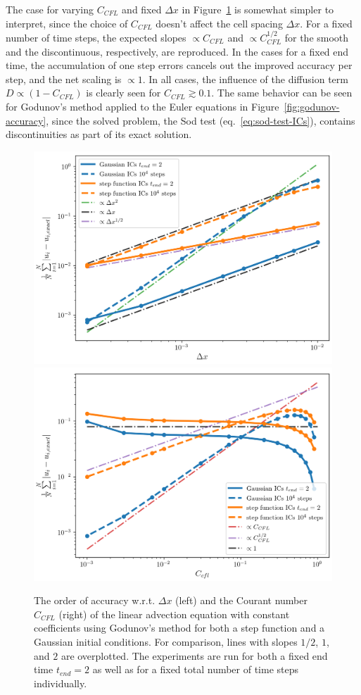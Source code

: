 The case for varying $C_{CFL}$ and fixed $\Delta x$ in Figure~\ref{fig:linear-advection-accuracy}
is somewhat simpler to interpret, since the choice of $C_{CFL}$ doesn't affect the cell spacing
$\Delta x$. For a fixed number of time steps, the expected slopes $\propto C_{CFL}$ and $\propto
C_{CFL}^{1/2}$ for the smooth and the discontinuous, respectively, are reproduced. In the cases for
a fixed end time, the accumulation of one step errors cancels out the improved accuracy per step,
and the net scaling is $\propto 1$. In all cases, the influence of the diffusion term $D \propto (1
- C_{CFL})$ is clearly seen for $C_{CFL} \gtrsim 0.1$. The same behavior can be seen for Godunov's
method applied to the Euler equations in Figure~\ref{fig:godunov-accuracy}, since the solved
problem, the Sod test (eq.~\ref{eq:sod-test-ICs}), contains discontinuities as part of its exact
solution.



\begin{figure}
    \centering
    \includegraphics[width=.5\textwidth]{
    ./figures/FV/advection_pwconst/accuracy_dx.png}%
    \includegraphics[width=.5\textwidth]{
    ./figures/FV/advection_pwconst/accuracy_CFL.png}%
    \caption[Order of accuracy w.r.t $\Delta x$ and $C_{CFL}$ for linear advection using Godunov's
method.]{
The order of accuracy w.r.t. $\Delta x$ (left) and the Courant number $C_{CFL}$ (right) of
the linear advection equation with constant coefficients using Godunov's method for both a step
function and a Gaussian initial conditions. For comparison, lines with slopes $1/2$, $1$, and $2$
are overplotted. The experiments are run for both a fixed end time $t_{end} = 2$ as well as for a
fixed total number of time steps individually.
    }%
    \label{fig:linear-advection-accuracy}
\end{figure}





